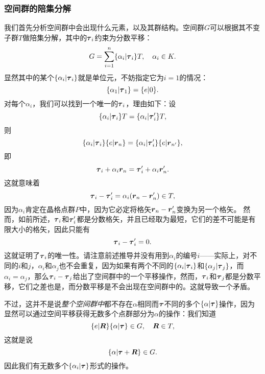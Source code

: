 \subsubsection{空间群的陪集分解} 

我们首先分析空间群中会出现什么元素，以及其群结构。空间群$G$可以根据其不变子群$T$做陪集分解，其中的$\vb*{\tau}_i$约束为分数平移：
\begin{equation}
    G = \sum_{i=1}^n \{ \alpha_i | \vb*{\tau}_i \} T, \quad \alpha_i \in K.
    \label{eq:coset-space-group}
\end{equation}
显然其中的某个$\{\alpha_i | \vb*{\tau}_i \}$就是单位元，不妨指定它为$i=1$的情况：
\begin{equation}
    \{\alpha_1 | \vb*{\tau}_1 \} = \{ e | 0 \}.
\end{equation}
对每个$\alpha_i$，我们可以找到一个唯一的$\vb*{\tau}_i$，理由如下：设
\[
    \{\alpha_i | \vb*{\tau}_i \} T = \{ \alpha_i | \vb*{\tau}'_i \} T,
\]
则
\[
    \{\alpha_i | \vb*{\tau}_i \} \{ e | \vb*{r}_n \} = \{\alpha_i | \vb*{\tau}'_i \} \{ e | \vb*{r}_{n'} \},
\]
即
\[
    \vb*{\tau}_i + \alpha_i \vb*{r}_n = \vb*{\tau}_i' + \alpha_i \vb*{r}_n'.
\]
这就意味着
\[
    \vb*{\tau}_i - \vb*{\tau}_i' = \alpha_i (\vb*{r}_n - \vb*{r}_n') \in T,
\]
因为$\alpha_i$肯定在晶格点群$P$中，因为它必定将格矢$\vb*{r}_n - \vb*{r}_n'$变换为另一个格矢。
然而，如前所述，$\vb*{\tau}_i$和$\vb*{\tau}_i'$都是分数格矢，并且已经取为最短，它们的差不可能是有限大小的格矢，因此只能有
\[
    \vb*{\tau}_i - \vb*{\tau}_i' = 0.
\]
这就证明了$\vb*{\tau}_i$的唯一性。请注意前述推导并没有用到$\alpha_i$的编号$i$——实际上，对不同的$i$和$j$，$\alpha_i$和$\alpha_j$也不会重复，因为如果有两个不同的$\{\alpha_i | \vb*{\tau}_i \}$和$\{\alpha_j | \vb*{\tau}_j \}$，而$\alpha_i = \alpha_j$，那么$\vb*{\tau}_i - \vb*{\tau}_j$给出了空间群中的一个平移操作，然而，$\vb*{\tau}_i$和$\vb*{\tau}_j$都是分数平移，它们之差也是，而分数平移是不会出现在空间群中的。这就导致一个矛盾。

不过，这并不是说\emph{整个空间群中}都不存在$\alpha$相同而$\vb*{\tau}$不同的多个$\{ \alpha | \vb*{\tau} \}$操作，因为显然可以通过空间平移获得无数多个点群部分为$\alpha$的操作：我们知道
\[
    \{e | \vb*{R}\} \{\alpha | \vb*{\tau}\} \in G, \quad \vb*{R} \in T,
\]
这就是说
\[
    \{\alpha | \vb*{\tau} + \vb*{R} \} \in G.
\]
因此我们有无数多个$\{ \alpha_i | \vb*{\tau} \}$形式的操作。


